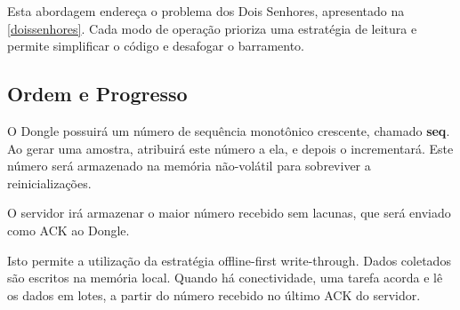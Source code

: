 \documentclass[12pt]{article}
\begin{document}
Esta abordagem endereça o problema dos Dois Senhores, apresentado na \autoref{doissenhores}. Cada modo de operação prioriza uma estratégia de leitura e permite simplificar o código e desafogar o barramento.

\subsection{Ordem e Progresso} \label{ordemeprogresso}

O Dongle possuirá um número de sequência monotônico crescente, chamado \textbf{seq}. Ao gerar uma amostra, atribuirá este número a ela, e depois o incrementará. Este número será armazenado na memória não-volátil para sobreviver a reinicializações.

O servidor irá armazenar o maior número recebido sem lacunas, que será enviado como ACK ao Dongle.

Isto permite a utilização da estratégia offline-first write-through. Dados coletados são escritos na memória local. Quando há conectividade, uma tarefa acorda e lê os dados em lotes, a partir do número recebido no último ACK do servidor.
\end{document}

